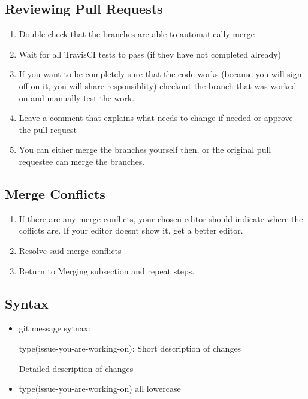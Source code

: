 \documentclass{article}
\begin{document}
		\subsection{Reviewing Pull Requests}
			\begin{enumerate}
				\item Double check that the branches are able to automatically merge
				\item Wait for all TravisCI tests to pass (if they have not completed already)
				\item If you want to be completely sure that the code works (because you will sign off on it, you will share responsiblity) checkout the branch that was worked on and manually test the work.
				\item Leave a comment that explains what needs to change if needed or approve the pull request
				\item You can either merge the branches yourself then, or the original pull requestee can merge the branches.
			\end{enumerate}
		\subsection{Merge Conflicts}
			\begin{enumerate}
				\item If there are any merge conflicts, your chosen editor should indicate where the coflicts are. If your editor doesnt show it, get a better editor.
				\item Resolve said merge conflicts
				\item Return to Merging subsection and repeat steps.
			\end{enumerate}
		\subsection{Syntax}
			\begin{itemize}
				\item git message sytnax:
				 
				type(issue-you-are-working-on): Short description of changes
				
				Detailed description of changes
				\item type(issue-you-are-working-on) all lowercase
			\end{itemize}
\end{document}
